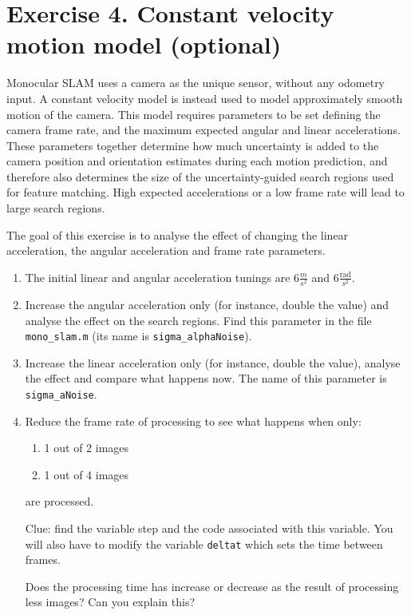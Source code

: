 \documentclass[a4paper,12pt]{article}
\begin{document}
\section{Exercise 4. Constant velocity motion model (optional)}
Monocular SLAM uses a camera as the unique sensor, without any
odometry input. A constant velocity model is instead used to model
approximately smooth motion of the camera. This model requires
parameters to be set defining the camera frame rate, and the maximum
expected angular and linear accelerations. These parameters together
determine how much uncertainty is added to the camera position and
orientation estimates during each motion prediction, and therefore
also determines the size of the uncertainty-guided search regions used
for feature matching. High expected accelerations or a low frame rate
will lead to large search regions.


The goal of this exercise is to analyse the effect of changing the linear
acceleration, the angular acceleration and frame rate parameters.

\begin{enumerate}
\item The initial linear and angular acceleration tunings are $6\frac{m}{s^2}$ and $6\frac{\mbox{rad}}{s^2}$.
\item Increase the angular acceleration only (for instance, double
the value) and analyse the effect on the search regions. Find this
parameter in the file \texttt{mono\_slam.m} (its name is
\texttt{sigma\_alphaNoise}).

\item Increase the linear acceleration only (for instance, double
the value), analyse the effect and compare what happens now. The name of this parameter is \texttt{sigma\_aNoise}.

\item Reduce the frame rate of processing to see what happens when only:
\begin{enumerate}
\item 1 out of 2 images
\item 1 out of 4 images
\end{enumerate}
are processed.

Clue: find the variable step and the code associated with this
variable. You will also have to modify the variable
\texttt{deltat} which sets the time between frames.

Does the processing time has increase or decrease as the result of
processing less images? Can you explain this?


\end{enumerate}

\nocite{Hartley2004,Davison2003,Montiel2006RSS,Bar-Shalom-88}


\end{document}

